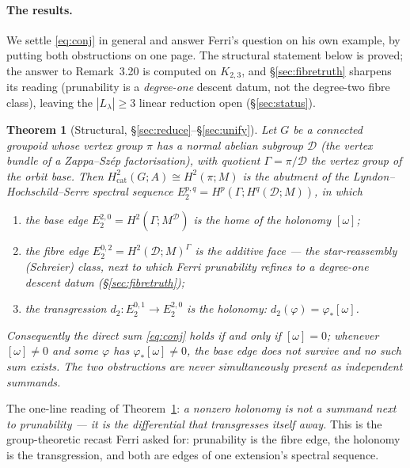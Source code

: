 \documentclass[11pt]{article}
\newtheorem{theorem}{Theorem}
\theoremstyle{definition}
\newcommand{\D}{\mathcal{D}}
\begin{document}
\paragraph{The results.} We settle \eqref{eq:conj} in general and answer Ferri's question on
his own example, by putting both obstructions on one page. The structural statement below is
proved; the answer to Remark~3.20 is computed on $K_{2,3}$, and \S\ref{sec:fibretruth} sharpens
its reading (prunability is a \emph{degree-one} descent datum, not the degree-two fibre class),
leaving the $|L_\lambda|\ge3$ linear reduction open (\S\ref{sec:status}).

\begin{theorem}[Structural, \S\ref{sec:reduce}--\S\ref{sec:unify}]\label{thm:main-struct}
Let $G$ be a connected groupoid whose vertex group $\pi$ has a normal abelian subgroup
$\D$ (the vertex bundle of a Zappa--Sz\'ep factorisation), with quotient $\Gamma=\pi/\D$
the vertex group of the orbit base. Then $H^2_{\mathrm{cat}}(G;A)\cong H^2(\pi;M)$ is the
abutment of the Lyndon--Hochschild--Serre spectral sequence
$E_2^{p,q}=H^p(\Gamma;H^q(\D;M))$, in which
\begin{enumerate}
\item[\textup{(i)}] the \emph{base edge} $E_2^{2,0}=H^2(\Gamma;M^\D)$ is the home of the
holonomy $[\omega]$;
\item[\textup{(ii)}] the \emph{fibre edge} $E_2^{0,2}=H^2(\D;M)^\Gamma$ is the additive face ---
the star-reassembly (Schreier) class, next to which Ferri prunability refines to a degree-one
descent datum (\S\ref{sec:fibretruth});
\item[\textup{(iii)}] the transgression $d_2\colon E_2^{0,1}\to E_2^{2,0}$ \emph{is} the
holonomy: $d_2(\varphi)=\varphi_*[\omega]$.
\end{enumerate}
Consequently the direct sum \eqref{eq:conj} holds if and only if $[\omega]=0$; whenever
$[\omega]\neq0$ and some $\varphi$ has $\varphi_*[\omega]\neq0$, the base edge does not
survive and no such sum exists. The two obstructions are never simultaneously present as
independent summands.
\end{theorem}

The one-line reading of Theorem~\ref{thm:main-struct}: \emph{a nonzero holonomy is not a
summand next to prunability --- it is the differential that transgresses itself away.} This
is the group-theoretic recast Ferri asked for: prunability is the fibre edge, the holonomy
is the transgression, and both are edges of one extension's spectral sequence.
\end{document}
